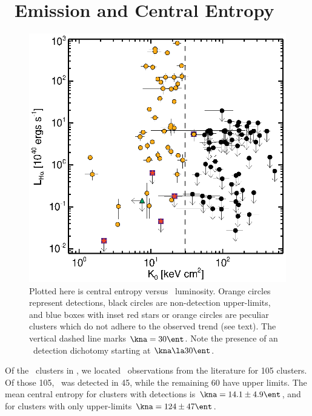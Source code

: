 \documentclass{emulateapj}
\begin{document}
\section{\halpha\ Emission and Central Entropy}
\label{sec:sf}

\begin{figure}
  \begin{center}
    \includegraphics*[width=\columnwidth, trim=28mm 7mm 40mm 17mm, clip]{ha}
    \caption{Plotted here is central entropy versus
      \halpha\ luminosity. Orange circles represent detections, black
      circles are non-detection upper-limits, and blue boxes with
      inset red stars or orange circles are peculiar clusters which do
      not adhere to the observed trend (see text). The vertical dashed
      line marks $\kna = 30 \ent$.  Note the presence of an
      \halpha\ detection dichotomy starting at $\kna \la 30 \ent$.}
    \label{fig:ha}
  \end{center}
\end{figure}

Of the \clnum\ clusters in \accept, we located \halpha\ observations
from the literature for 105 clusters. Of those 105, \halpha\ was
detected in 45, while the remaining 60 have upper limits. The mean
central entropy for clusters with detections is $\kna = 14.1 \pm 4.9
\ent$, and for clusters with only upper-limits $\kna = 124 \pm 47
\ent$.
\end{document}
